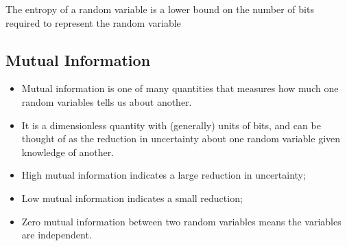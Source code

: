 The entropy of a random variable is a lower bound on the number of bits required to represent the random 
variable 


\begin{frame}
\subsection*{Mutual Information}

\begin{itemize}
\item Mutual information is one of many quantities that measures how much one random variables tells us about another. 
\item It is a dimensionless quantity with (generally) units of bits, and can be thought of as the reduction in 
uncertainty about one random variable given knowledge of another. 
\item High mutual information indicates a 
large reduction in uncertainty; 
\item Low mutual information indicates a small reduction; \item Zero mutual information between two random variables means the variables are independent.
\end{itemize}
\end{frame}





